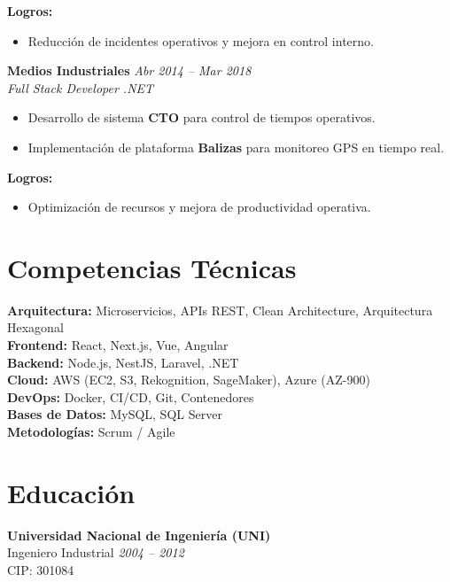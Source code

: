 \documentclass[11pt,a4paper]{article}
\begin{document}
\textbf{Logros:}
\begin{itemize}[leftmargin=*]
  \item Reducción de incidentes operativos y mejora en control interno.
\end{itemize}

\vspace{6pt}

\textbf{Medios Industriales} \hfill \textit{Abr 2014 – Mar 2018}\\
\textit{Full Stack Developer .NET}

\begin{itemize}[leftmargin=*]
  \item Desarrollo de sistema \textbf{CTO} para control de tiempos operativos.
  \item Implementación de plataforma \textbf{Balizas} para monitoreo GPS en tiempo real.
\end{itemize}

\textbf{Logros:}
\begin{itemize}[leftmargin=*]
  \item Optimización de recursos y mejora de productividad operativa.
\end{itemize}

\section*{Competencias Técnicas}

\textbf{Arquitectura:} Microservicios, APIs REST, Clean Architecture, Arquitectura Hexagonal\\
\textbf{Frontend:} React, Next.js, Vue, Angular\\
\textbf{Backend:} Node.js, NestJS, Laravel, .NET\\
\textbf{Cloud:} AWS (EC2, S3, Rekognition, SageMaker), Azure (AZ-900)\\
\textbf{DevOps:} Docker, CI/CD, Git, Contenedores\\
\textbf{Bases de Datos:} MySQL, SQL Server\\
\textbf{Metodologías:} Scrum / Agile

\section*{Educación}

\textbf{Universidad Nacional de Ingeniería (UNI)}\\
Ingeniero Industrial \hfill \textit{2004 – 2012}\\
CIP: 301084
\end{document}
